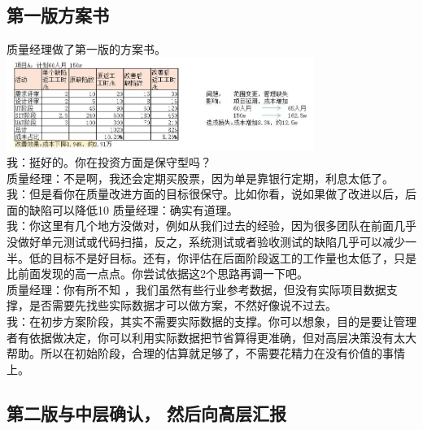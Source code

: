 
\hypertarget{ux7b2cux4e00ux7248ux65b9ux6848ux4e66}{%
\subsection{第一版方案书}\label{ux7b2cux4e00ux7248ux65b9ux6848ux4e66}}

质量经理做了第一版的方案书。\\

\includegraphics[width=10cm]{方案书1.jpg}\\

我：挺好的。你在投资方面是保守型吗？\\
质量经理：不是啊，我还会定期买股票，因为单是靠银行定期，利息太低了。\\
我：但是看你在质量改进方面的目标很保守。比如你看，说如果做了改进以后，后面的缺陷可以降低10%
质量经理：确实有道理。\\
我：你这里有几个地方没做对，例如从我们过去的经验，因为很多团队在前面几乎没做好单元测试或代码扫描，反之，系统测试或者验收测试的缺陷几乎可以减少一半。低的目标不是好目标。还有，你评估在后面阶段返工的工作量也太低了，只是比前面发现的高一点点。你尝试依据这2个思路再调一下吧。\\
质量经理：你有所不知
，我们虽然有些行业参考数据，但没有实际项目数据支撑，是否需要先找些实际数据才可以做方案，不然好像说不过去。\\
我：在初步方案阶段，其实不需要实际数据的支撑。你可以想象，目的是要让管理者有依据做决定，你可以利用实际数据把节省算得更准确，但对高层决策没有太大帮助。所以在初始阶段，合理的估算就足够了，不需要花精力在没有价值的事情上。\\

\hypertarget{ux7b2cux4e8cux7248ux4e0eux4e2dux5c42ux786eux8ba4-ux7136ux540eux5411ux9ad8ux5c42ux6c47ux62a5}{%
\subsection{第二版与中层确认，
然后向高层汇报}\label{ux7b2cux4e8cux7248ux4e0eux4e2dux5c42ux786eux8ba4-ux7136ux540eux5411ux9ad8ux5c42ux6c47ux62a5}}

